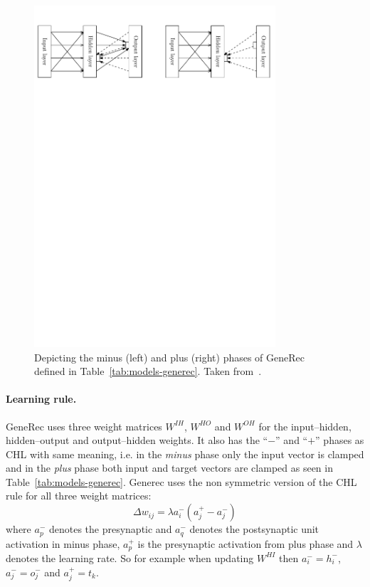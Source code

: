 \begin{figure}[H]
  \centering
  \includegraphics[width=0.8\textwidth]{img/models-generec-phase.pdf}
  
  \caption{Depicting the minus (left) and plus (right) phases of GeneRec defined in Table~\ref{tab:models-generec}. Taken from~\citet{orru2008sabio}.} 
  \label{fig:models-generec-phase}
\end{figure}

\paragraph{Learning rule.} 
\label{sec:models-generec-learning-rule} 
GeneRec uses three weight matrices $W^{IH}$, $W^{HO}$ and $W^{OH}$ for the input--hidden, hidden--output and output--hidden weights. It also has the ``$-$'' and ``$+$'' phases as CHL with same meaning, i.e. in the \emph{minus} phase only the input vector is clamped and in the \emph{plus} phase both input and target vectors are clamped as seen in Table~\ref{tab:models-generec}. Generec uses the non symmetric version of the CHL rule for all three weight matrices: 
\begin{equation}
  \label{eq:models-generec-learning-rule}
  \Delta w_{ij} = \lambda a^{-}_i(a^{+}_j - a^{-}_j)
\end{equation}
where $a^{-}_p$ denotes the presynaptic and $a^{-}_q$ denotes the postsynaptic unit activation in minus phase, $a^{+}_p$ is the presynaptic activation from plus phase and $\lambda$ denotes the learning rate. So for example when updating $W^{HI}$ then $a^{-}_i = h^{-}_i$, $a^{-}_j = o^{-}_j$ and $a^{+}_j = t_k$. 



